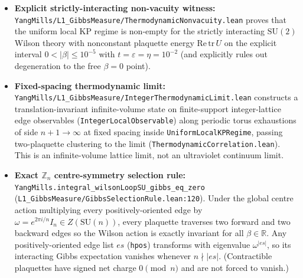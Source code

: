 \documentclass[11pt]{article}
\begin{document}
\begin{itemize}
  and its paired KP smallness bound, and any two distinct plaquettes $p \neq q$ at
  touching-graph distance $2k \le \mathrm{dist}_{\mathrm{touchGraph}}(p,q)$, the connected
  two-plaquette correlator under the Wilson Gibbs measure with action
  $-\beta\,\mathrm{wilsonAction}(\mathrm{Re}\,\mathrm{tr})$ decays as
  $|\mathrm{Cov}_\beta(f(U_p), f(U_q))| \le C(d,N_c,\beta,s,t,\varepsilon)\,e^{-\varepsilon k}$,
  uniformly in lattice side $N$.
  \item \textbf{Explicit strictly-interacting non-vacuity witness:}
  \nolinkurl{YangMills/L1_GibbsMeasure/ThermodynamicNonvacuity.lean} proves that the
  uniform local KP regime is non-empty for the strictly interacting $\mathrm{SU}(2)$
  Wilson theory with nonconstant plaquette energy $\mathrm{Re}\,\mathrm{tr}\,U$ on the
  explicit interval $0 < |\beta| \le 10^{-5}$ with $t = \varepsilon = \eta = 10^{-2}$
  (and explicitly rules out degeneration to the free $\beta = 0$ point).
  \item \textbf{Fixed-spacing thermodynamic limit:}
  \nolinkurl{YangMills/L1_GibbsMeasure/IntegerThermodynamicLimit.lean} constructs a
  translation-invariant infinite-volume state on finite-support integer-lattice edge
  observables (\texttt{IntegerLocalObservable}) along periodic torus exhaustions of side
  $n+1 \to \infty$ at fixed spacing inside \texttt{UniformLocalKPRegime}, passing
  two-plaquette clustering to the limit (\nolinkurl{ThermodynamicCorrelation.lean}). This is
  an infinite-volume lattice limit, not an ultraviolet continuum limit.
  \item \textbf{Exact $\mathbb{Z}_n$ centre-symmetry selection rule:}
  \nolinkurl{YangMills.integral_wilsonLoopSU_gibbs_eq_zero}
  (\nolinkurl{L1_GibbsMeasure/GibbsSelectionRule.lean:120}). Under the global centre action
  multiplying every positively-oriented edge by $\omega = e^{2\pi i/n} I_n \in Z(\mathrm{SU}(n))$,
  every plaquette traverses two forward and two backward edges so the Wilson action is
  exactly invariant for all $\beta \in \mathbb{R}$. Any positively-oriented edge list $es$
  (\texttt{hpos}) transforms with eigenvalue $\omega^{|es|}$, so its interacting Gibbs
  expectation vanishes whenever $n \nmid |es|$. (Contractible plaquettes have signed net
  charge $0 \pmod n$ and are not forced to vanish.)
\end{itemize}
\end{document}
